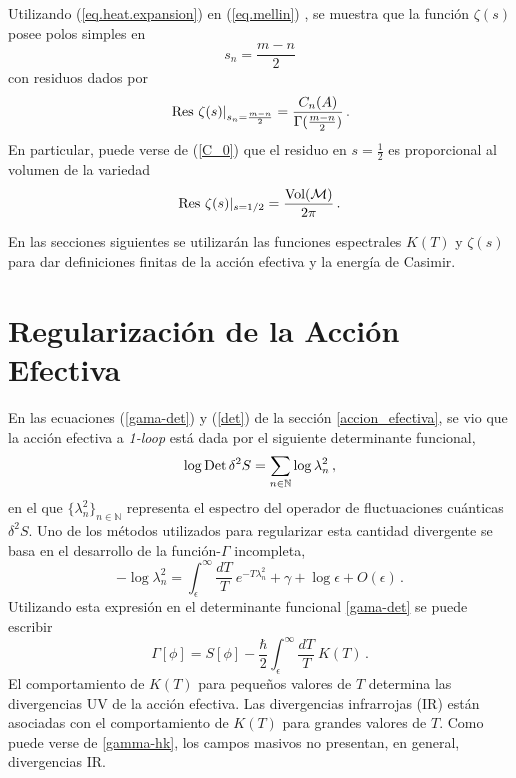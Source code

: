 Utilizando (\ref{eq.heat.expansion}) en  (\ref{eq.mellin}) , se muestra que la función $\zeta (s)$ posee polos simples en
\begin{equation}
s _n = \frac{m-n}{2} 
\label{eq.ceros.zeta}
\end{equation}
con residuos dados por
\begin{equation}
\left. {\rm Res} \ \zeta  (s)  \right| _{s_n= \frac{m - n}{2}} =  
\frac{ C_n  (A) }{ {\Gamma ( \frac{m-n}{2}} ) }
	\, .
\label{losresi}
\end{equation}
En particular, puede verse de (\ref{C_0}) que el residuo en $s=\frac{1}{2}$ es proporcional al volumen de la variedad
\begin{equation}\label{eq.vol}
	{\rm Res} \ \zeta (s) | _{s=1/2} = \frac{ {\rm Vol (\mathcal{M})} }{2 \pi} \, .
\end{equation}


En las secciones siguientes se utilizarán las funciones espectrales $K(T)$ y $\zeta(s) $ para dar definiciones finitas de la acción efectiva y la energía de Casimir.

\section{Regularización de la Acción Efectiva}\label{cap.acc}

En las ecuaciones (\ref{gama-det}) y (\ref{det}) de la sección \ref{accion_efectiva}, se vio que la acción efectiva a {\it 1-loop} está dada por el siguiente determinante funcional,
\begin{equation}
    \log {\rm Det} \, \delta ^2 S = 
    \sum_{n\in{\mathbb N}} \log \lambda ^2 _n
    \, ,
\end{equation}
en el que $\{\lambda ^2 _n\}_{n\in\mathbb N}$ representa el espectro del operador de fluctuaciones cuánticas $\delta^2S$. Uno de los métodos utilizados para regularizar esta cantidad divergente se basa en el desarrollo de la función-$\Gamma$ incompleta,
\begin{equation}
- \log\lambda ^2 _n=\int _ { \epsilon } ^{\infty}\frac{dT}{T}\ e ^{- T \lambda ^2 _n} +\gamma+\log\epsilon + O ( \epsilon  ) \,.
\end{equation}
Utilizando esta expresión en el determinante funcional  \eqref{gama-det} se puede escribir
\begin{equation}\label{gamma-hk}
\Gamma [ \phi ] = 
S[ \phi ] - 
\frac{\hbar }{2}
\int _ { \epsilon } ^{\infty} \frac{ dT}{T}\ K(T) \, .
\end{equation}
El comportamiento de $K(T)$ para pequeños valores de $T$ determina las divergencias UV de la acción efectiva. Las divergencias infrarrojas (IR) están asociadas con el comportamiento de $K(T)$ para grandes valores de $T$. Como puede verse de \eqref{gamma-hk}, los campos masivos no presentan, en general, divergencias IR.

